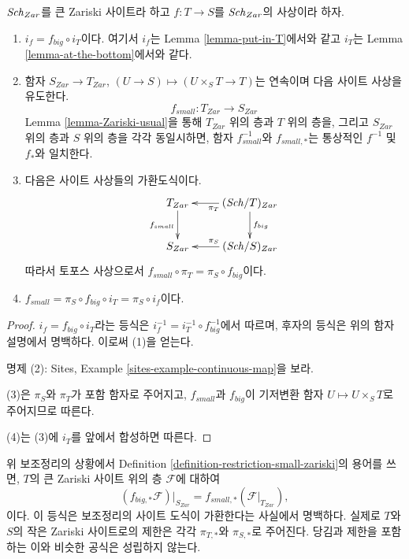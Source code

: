 \begin{lemma}
\label{lemma-morphism-big-small}
$\mathit{Sch}_{Zar}$를 큰 Zariski 사이트라 하고
$f : T \to S$를 $\mathit{Sch}_{Zar}$의 사상이라 하자.
\begin{enumerate}
\item $i_f = f_{big} \circ i_T$이다. 여기서 $i_f$는 Lemma
\ref{lemma-put-in-T}에서와 같고 $i_T$는 Lemma
\ref{lemma-at-the-bottom}에서와 같다.
\item 함자 $S_{Zar} \to T_{Zar}$,
$(U \to S) \mapsto (U \times_S T \to T)$는 연속이며 다음 사이트
사상을 유도한다.
$$
f_{small} :
T_{Zar}
\longrightarrow
S_{Zar}
$$
Lemma \ref{lemma-Zariski-usual}을 통해 $T_{Zar}$ 위의 층과 $T$ 위의
층을, 그리고 $S_{Zar}$ 위의 층과 $S$ 위의 층을 각각 동일시하면,
함자 $f_{small}^{-1}$와 $f_{small, *}$는 통상적인 $f^{-1}$ 및 $f_*$와
일치한다.
\item 다음은 사이트 사상들의 가환도식이다.
$$
\xymatrix{
T_{Zar} \ar[d]_{f_{small}} &
(\Sch/T)_{Zar} \ar[d]^{f_{big}} \ar[l]^{\pi_T} \\
S_{Zar} &
(\Sch/S)_{Zar} \ar[l]_{\pi_S}
}
$$
따라서 토포스 사상으로서
$f_{small} \circ \pi_T = \pi_S \circ f_{big}$이다.
\item $f_{small} = \pi_S \circ f_{big} \circ i_T = \pi_S \circ i_f$이다.
\end{enumerate}
\end{lemma}

\begin{proof}
$i_f = f_{big} \circ i_T$라는 등식은
$i_f^{-1} = i_T^{-1} \circ f_{big}^{-1}$에서 따르며, 후자의 등식은 위의
함자 설명에서 명백하다. 이로써 (1)을 얻는다.

\medskip\noindent
명제 (2): Sites, Example \ref{sites-example-continuous-map}을 보라.

\medskip\noindent
(3)은 $\pi_S$와 $\pi_T$가 포함 함자로 주어지고, $f_{small}$과
$f_{big}$이 기저변환 함자 $U \mapsto U \times_S T$로 주어지므로 따른다.

\medskip\noindent
(4)는 (3)에 $i_T$를 앞에서 합성하면 따른다.
\end{proof}

\noindent
위 보조정리의 상황에서 Definition
\ref{definition-restriction-small-zariski}의 용어를 쓰면, $T$의 큰
Zariski 사이트 위의 층 $\mathcal{F}$에 대하여
$$
(f_{big, *}\mathcal{F})|_{S_{Zar}} =
f_{small, *}(\mathcal{F}|_{T_{Zar}}),
$$
이다. 이 등식은 보조정리의 사이트 도식이 가환한다는 사실에서
명백하다. 실제로 $T$와 $S$의 작은 Zariski 사이트로의 제한은 각각
$\pi_{T, *}$와 $\pi_{S, *}$로 주어진다. 당김과 제한을 포함하는 이와
비슷한 공식은 성립하지 않는다.

